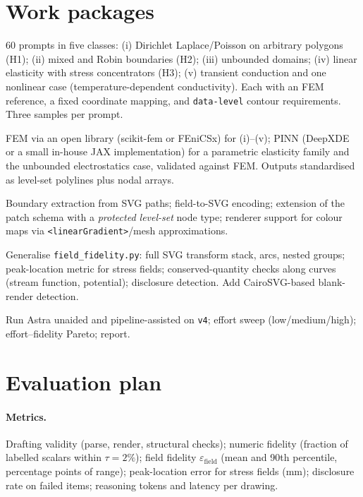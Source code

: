 \documentclass[11pt,a4paper]{article}
\newcommand{\eps}{\varepsilon_{\mathrm{field}}}
\begin{document}
\section{Work packages}
\begin{description}[style=nextline,leftmargin=1em]
  \item[WP1 --- Benchmark \texttt{engineering\_v4}.] 60 prompts in five classes: (i) Dirichlet Laplace/Poisson on arbitrary polygons (H1); (ii) mixed and Robin boundaries (H2); (iii) unbounded domains; (iv) linear elasticity with stress concentrators (H3); (v) transient conduction and one nonlinear case (temperature-dependent conductivity). Each with an FEM reference, a fixed coordinate mapping, and \texttt{data-level} contour requirements. Three samples per prompt.
  \item[WP2 --- Reference solvers.] FEM via an open library (scikit-fem or FEniCSx) for (i)--(v); PINN (DeepXDE or a small in-house JAX implementation) for a parametric elasticity family and the unbounded electrostatics case, validated against FEM. Outputs standardised as level-set polylines plus nodal arrays.
  \item[WP3 --- SVG integration.] Boundary extraction from SVG paths; field-to-SVG encoding; extension of the patch schema with a \emph{protected level-set} node type; renderer support for colour maps via \texttt{<linearGradient>}/mesh approximations.
  \item[WP4 --- Verification suite.] Generalise \texttt{field\_fidelity.py}: full SVG transform stack, arcs, nested groups; peak-location metric for stress fields; conserved-quantity checks along curves (stream function, potential); disclosure detection. Add CairoSVG-based blank-render detection.
  \item[WP5 --- Evaluation.] Run Astra unaided and pipeline-assisted on \texttt{v4}; effort sweep (low/medium/high); effort--fidelity Pareto; report.
\end{description}

\section{Evaluation plan}
\paragraph{Metrics.} Drafting validity (parse, render, structural checks); numeric fidelity (fraction of labelled scalars within $\tau=2\%$); field fidelity $\eps$ (mean and 90th percentile, percentage points of range); peak-location error for stress fields (mm); disclosure rate on failed items; reasoning tokens and latency per drawing.
\end{document}
